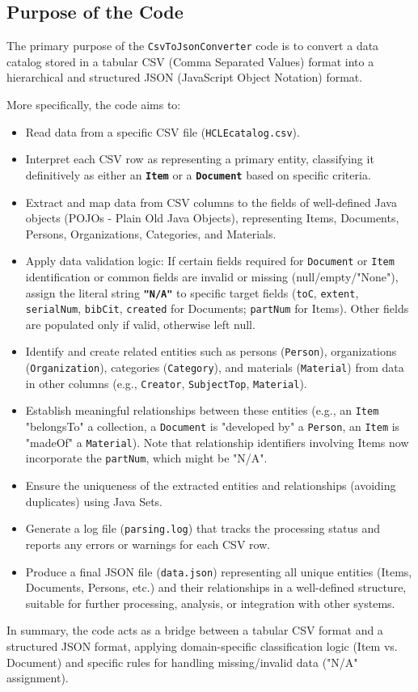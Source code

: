 \subsection{Purpose of the Code}
The primary purpose of the \texttt{CsvToJsonConverter} code is to convert a data catalog stored in a tabular CSV (Comma Separated Values) format into a hierarchical and structured JSON (JavaScript Object Notation) format.

More specifically, the code aims to:
\begin{itemize}
    \item Read data from a specific CSV file (\texttt{HCLEcatalog.csv}).
    \item Interpret each CSV row as representing a primary entity, classifying it definitively as either an \textbf{\texttt{Item}} or a \textbf{\texttt{Document}} based on specific criteria.
    \item Extract and map data from CSV columns to the fields of well-defined Java objects (POJOs - Plain Old Java Objects), representing Items, Documents, Persons, Organizations, Categories, and Materials.
    \item Apply data validation logic: If certain fields required for \texttt{Document} or \texttt{Item} identification or common fields are invalid or missing (null/empty/"None"), assign the literal string \textbf{\texttt{"N/A"}} to specific target fields (\texttt{toC}, \texttt{extent}, \texttt{serialNum}, \texttt{bibCit}, \texttt{created} for Documents; \texttt{partNum} for Items). Other fields are populated only if valid, otherwise left null.
    \item Identify and create related entities such as persons (\texttt{Person}), organizations (\texttt{Organization}), categories (\texttt{Category}), and materials (\texttt{Material}) from data in other columns (e.g., \texttt{Creator}, \texttt{SubjectTop}, \texttt{Material}).
    \item Establish meaningful relationships between these entities (e.g., an \texttt{Item} "belongsTo" a collection, a \texttt{Document} is "developed by" a \texttt{Person}, an \texttt{Item} is "madeOf" a \texttt{Material}). Note that relationship identifiers involving Items now incorporate the \texttt{partNum}, which might be "N/A".
    \item Ensure the uniqueness of the extracted entities and relationships (avoiding duplicates) using Java Sets.
    \item Generate a log file (\texttt{parsing.log}) that tracks the processing status and reports any errors or warnings for each CSV row.
    \item Produce a final JSON file (\texttt{data.json}) representing all unique entities (Items, Documents, Persons, etc.) and their relationships in a well-defined structure, suitable for further processing, analysis, or integration with other systems.
\end{itemize}
In summary, the code acts as a bridge between a tabular CSV format and a structured JSON format, applying domain-specific classification logic (Item vs. Document) and specific rules for handling missing/invalid data ("N/A" assignment).

